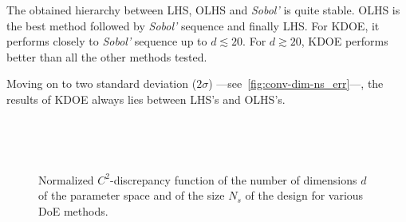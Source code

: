 The obtained hierarchy between LHS, OLHS and \emph{Sobol'} is quite stable. OLHS is the best method followed by \emph{Sobol'} sequence and finally LHS. For KDOE, it performs closely to \emph{Sobol'} sequence up to $d \lesssim 20$. For $d \gtrsim 20$, KDOE performs better than all the other methods tested.

Moving on to two standard deviation ($2\sigma$) ---\thinspace see~\cref{fig:conv-dim-ns_err}\thinspace---, the results of KDOE always lies between LHS’s and OLHS’s.

\begin{figure}[!ht]               
\centering
{}
 ~       

 ~       
\caption{Normalized $C^2$-discrepancy function of the number of dimensions $d$ of the parameter space and of the size $N_s$ of the design for various DoE methods.}
\label{fig:conv-dim-ns}
\end{figure}
